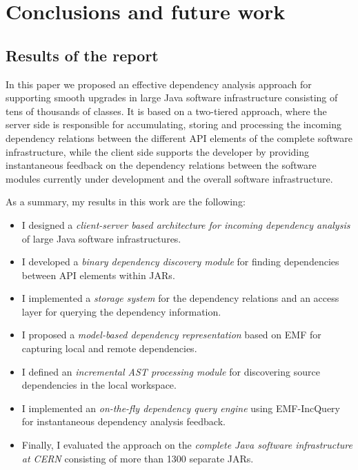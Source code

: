 \chapter{Conclusions and future work}


\section{Results of the report}

In this paper we proposed an effective dependency analysis approach for
supporting smooth upgrades in large Java software infrastructure consisting of
tens of thousands of classes. It is based on a two-tiered approach, where the
server side is responsible for accumulating, storing and processing the incoming
dependency relations between the different API elements of the complete software
infrastructure, while the client side supports the developer by providing
instantaneous feedback on the dependency relations between the software modules
currently under development and the overall software infrastructure.

As a summary, my results in this work are the following:
\begin{itemize}
\item I designed a \emph{client-server based architecture for incoming
dependency analysis} of large Java software infrastructures.
\item I developed a \emph{binary dependency discovery module} for finding
dependencies between API elements within JARs.
\item I implemented a \emph{storage system} for the dependency relations and an
access layer for querying the dependency information.
\item I proposed a \emph{model-based dependency representation} based on EMF for
capturing local and remote dependencies.
\item I defined an \emph{incremental AST processing module} for discovering
source dependencies in the local workspace.
\item I implemented an \emph{on-the-fly dependency query engine} using
EMF-IncQuery for instantaneous dependency analysis feedback.
\item Finally, I evaluated the approach on the \emph{complete Java software
infrastructure at CERN} consisting of more than 1300 separate JARs.
\end{itemize}

